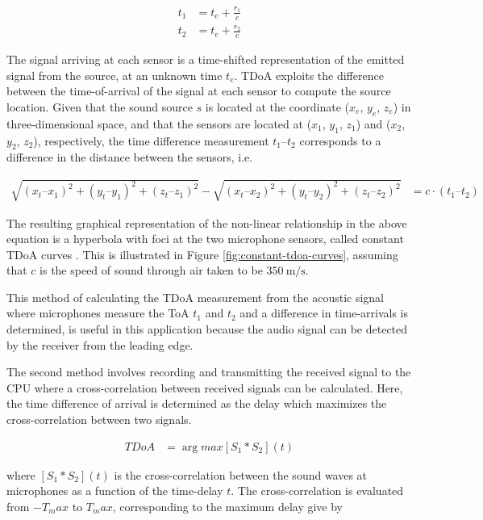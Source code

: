 \documentclass[a4paper,11pt]{article}
\begin{document}
\begin{align} 
	t_1	& = t_e + \frac{r_1}{c}\\ 
	t_2	& = t_e + \frac{r_2}{c} 
\end{align}  

The signal arriving at each sensor is a time-shifted representation of the emitted signal from the source, at an unknown time $t_e$. TDoA exploits the difference between the time-of-arrival of the signal at each sensor to compute the source location.  Given that the sound source $s$ is located at the coordinate ($x_e$, $y_e$, $z_e$) in three-dimensional space, and that the sensors are located at ($x_1$, $y_1$, $z_1$) and ($x_2$, $y_2$, $z_2$), respectively, the time difference measurement $t_1 – t_2$ corresponds to a difference in the distance between the sensors, i.e. 

\begin{align} 
	\sqrt{(x_t – x_1)^2 + (y_t – y_1)^2 + (z_t – z_1)^2} -  
	\sqrt{(x_t – x_2)^2 + (y_t – y_2)^2 + (z_t – z_2)^2}  & = c\cdot (t_1 – t_2) 	
\end{align}  

The resulting graphical representation of the non-linear relationship in the above equation is a hyperbola with foci at the two microphone sensors, called constant TDoA curves \cite{mathworkslink}. This is illustrated in Figure \ref{fig:constant-tdoa-curves}, assuming that $c$ is the speed of sound through air taken to be $\SI{350}{\meter\per\second}$.   

This method of calculating the TDoA measurement from the acoustic signal where microphones measure the ToA $t_1$ and $t_2$ and a difference in time-arrivals is determined, is useful in this application because the audio signal can be detected by the receiver from the leading edge. 

The second method involves recording and transmitting the received signal to the CPU where a cross-correlation between received signals can be calculated. Here, the time difference of arrival is determined as the delay which maximizes the cross-correlation between two signals.  

\begin{align} 
	TDoA	& = \arg max [S_1*S_2](t) 
\end{align} 

where $[S_1*S_2](t)$ is the cross-correlation between the sound waves at microphones as a function of the time-delay $t$.  The cross-correlation is evaluated from $-T_max$ to $T_max$, corresponding to the maximum delay give by  
\end{document}
